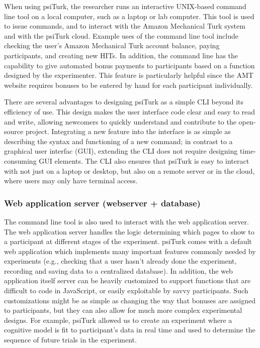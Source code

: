 \documentclass[twocolumn]{svjour3}          %
\newcommand{\psiturk}[0]{\textsf{psiTurk}}
\begin{document}
When using \psiturk{}, the researcher runs an
interactive UNIX-based command line tool on a local computer, such as a laptop
or lab computer. This tool is used to issue commands, and to interact with the
Amazon Mechanical Turk system and with the \psiturk{} cloud.  Example
uses of the command line tool include checking the user's Amazon Mechanical
Turk account balance, paying participants, and creating new HITs. In addition,
the command line has the capability to give automated bonus payments to
participants based on a function designed by the experimenter. This feature is
particularly helpful since the AMT website requires bonuses to be entered by
hand for each participant individually.

There are several advantages to designing \psiturk{} as a simple CLI beyond its
efficiency of use. This design makes the user interface code clear and easy to
read and write, allowing newcomers to quickly understand and contribute to the
open-source project. Integrating a new feature into the interface is as simple
as describing the syntax and functioning of a new command; in contrast to a
graphical user interfac (GUI), extending the CLI does not require designing
time-consuming GUI elements.  The CLI also ensures that \psiturk{} is easy to
interact with not just on a laptop or desktop, but also on a remote server or
in the cloud, where users may only have terminal access.


\subsubsection{Web application server (webserver + database)}

The command line tool is also used to interact with the web application server.
The web application server handles the logic determining which pages to show
to a participant at different stages of the experiment.  \psiturk{} comes with
a default web application which implements many important features commonly
needed by experiments (e.g., checking that a user hasn't already done the experiment,
recording and saving data to a centralized database).  In addition, the web application itself
server can be heavily customized to support functions that are difficult to code in JavaScript,
or easily exploitable by savvy participants. Such customizations might be as simple as changing
the way that bonuses are assigned to participants, but they can also allow for much
more complex experimental designs. For example, \psiturk{} allowed us to create an
experiment where a cognitive model is fit to participant's data in real time and used to determine the sequence of future
trials in the experiment.
\end{document}

